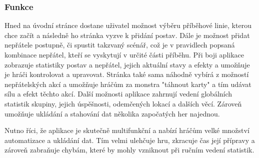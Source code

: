 \subsubsection*{Funkce}
Hned na úvodní stránce dostane uživatel možnost výběru příběhové linie, kterou chce začít a následně ho stránka vyzve k přidání postav. Dále je možnost přidat nepřátele postupně, či spustit takzvaný scénář, což je v pravidlech popsaná kombinace nepřátel, kteří se vyskytují v určité části příběhu. Při boji aplikace zobrazuje statistiky postav a nepřátel, jejich aktuální stavy a efekty a umožňuje je hráči kontrolovat a upravovat. Stránka také sama náhodně vybírá z možností nepřátelských akcí a umožňuje hráčům za monstra "táhnout karty" a tím udávat sílu a efekt těchto akcí. Další možnosti aplikace zahrnují vedení globálních statistik skupiny, jejich úspěšnosti, odemčených lokací a dalších věcí. Zároveň umožňuje ukládání a stahování dat několika započatých her najednou.

Nutno říci, že aplikace je skutečně multifunkční a nabízí hráčům velké množství automatizace a ukládání dat. Tím velmi ulehčuje hru, zkracuje čas její přípravy a zároveň zabraňuje chybám, které by mohly vzniknout při ručním vedení statistik.